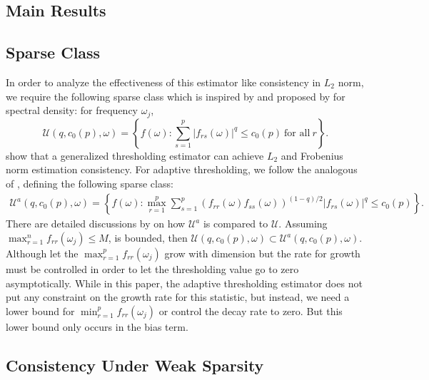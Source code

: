 \subsection{Main Results}
\subsection{Sparse Class}
In order to analyze the effectiveness of this estimator like consistency in $L_2$ norm, we require the following sparse class which is inspired by \cite{bickel2008covariance} and proposed by \cite{sun2018large} for spectral density: for frequency $\omega_j$, 
\begin{equation}
\mathcal{U}(q, c_0(p), \omega) = \left\{f(\omega): \sum_{s=1}^p |f_{rs}(\omega)|^q \le c_0(p) ~\text{for all}~ r\right \}. 
\end{equation}
\cite{sun2018large} show that a generalized thresholding estimator can achieve $L_2$ and Frobenius norm estimation consistency. For adaptive thresholding, we follow the analogous of \cite{cai2011adaptive}, defining the following sparse class:
\begin{equation}
\begin{aligned}
\label{eq:sparse_class}
\mathcal{U}^a(q, c_0(p), \omega) = \left\{f(\omega): \max_{r=1}^p\sum_{s=1}^p (f_{rr}(\omega)f_{ss}(\omega))^{(1-q)/2} |f_{rs}(\omega)|^q \le c_0(p)\right \}.  
\end{aligned}
\end{equation}
There are detailed discussions by \cite{cai2011adaptive}
on how $\mathcal{U}^a$ is compared to $\mathcal{U}$. Assuming $\max_{r=1}^n f_{rr}(\omega_j)\le M$, is bounded, then
$\mathcal{U}(q, c_0(p), \omega) \subset \mathcal{U}^a(q, c_0(p), \omega) $. Although \cite{sun2018large} let the $\max_{r=1}^p f_{rr}(\omega_j)$ grow with dimension but the rate for growth must be controlled in order to let the thresholding value go to zero asymptotically. While in this paper,  the adaptive thresholding estimator does not put any constraint on the growth rate for this statistic, but instead, we need a lower bound for $\min_{r=1}^p f_{rr}(\omega_j)$ or control the decay rate to zero. But this lower bound only occurs in the bias term. 

\subsection{Consistency Under Weak Sparsity}

